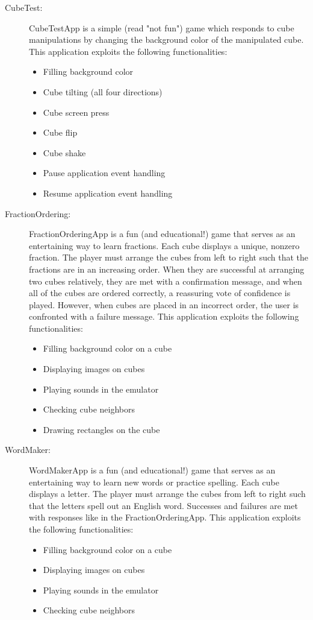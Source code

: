 \documentclass[12pt]{article}
\begin{document}
\begin{description}
	\item[CubeTest:]{CubeTestApp is a simple (read "not fun") game which responds to cube manipulations by changing the background color of the manipulated cube. This application exploits the following functionalities:
				\begin{itemize}
					\item{Filling background color}
					\item{Cube tilting (all four directions)}
					\item{Cube screen press}
					\item{Cube flip}
					\item{Cube shake}
					\item{Pause application event handling}
					\item{Resume application event handling}
				\end{itemize}
				}
	\item[FractionOrdering:]{FractionOrderingApp is a fun (and educational!) game that serves as an entertaining way to learn fractions. Each cube displays a unique, nonzero fraction. The player must arrange the cubes from left to right such that the fractions are in an increasing order. When they are successful at arranging two cubes relatively, they are met with a confirmation message, and when all of the cubes are ordered correctly, a reassuring vote of confidence is played. However, when cubes are placed in an incorrect order, the user is confronted with a failure message. This application exploits the following functionalities:
				\begin{itemize}
					\item{Filling background color on a cube}
					\item{Displaying images on cubes}
					\item{Playing sounds in the emulator}
					\item{Checking cube neighbors}
					\item{Drawing rectangles on the cube}
				\end{itemize}
				}
	\item[WordMaker:]{WordMakerApp is a fun (and educational!) game that serves as an entertaining way to learn new words or practice spelling. Each cube displays a letter. The player must arrange the cubes from left to right such that the letters spell out an English word. Successes and failures are met with responses like in the FractionOrderingApp. This application exploits the following functionalities:
				\begin{itemize}
					\item{Filling background color on a cube}
					\item{Displaying images on cubes}
					\item{Playing sounds in the emulator}
					\item{Checking cube neighbors}
				\end{itemize}
				}
\end{description}
\end{document}
